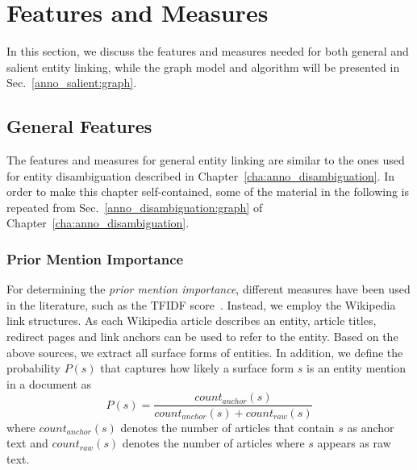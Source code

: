 \section{Features and Measures} \label{anno_salient:features}

In this section, we discuss the features and measures needed for both general and salient entity linking, while the graph model and algorithm will be presented in Sec.~\ref{anno_salient:graph}.

\subsection{General Features}

The features and measures for general entity linking are similar to the ones used for entity disambiguation described in Chapter~\ref{cha:anno_disambiguation}. In order to make this chapter self-contained, some of the material in the following is repeated from Sec.~\ref{anno_disambiguation:graph} of Chapter~\ref{cha:anno_disambiguation}.

\subsubsection{Prior Mention Importance} 
For determining the \emph{prior mention importance}, different measures have been used in the literature, such as the TFIDF score~\cite{DBLP:conf/sigir/HanSZ11}. Instead, we employ the Wikipedia link structures.
As each Wikipedia article describes an entity, article titles, redirect pages and link anchors can be used to refer to the entity. Based on the above sources, we extract all surface forms of entities.
In addition, we define the probability $P(s)$ that captures how likely a surface form $s$ is an entity mention in a document as
\begin{equation}\label{anno_salient:P(s)}
P(s)=\frac{count_{anchor}(s)}{count_{anchor}(s) + count_{raw}(s)}
\end{equation}
where $count_{anchor}(s)$ denotes the number of articles that contain $s$ as anchor text and $count_{raw}(s)$ denotes the number of articles where $s$ appears as raw text.

